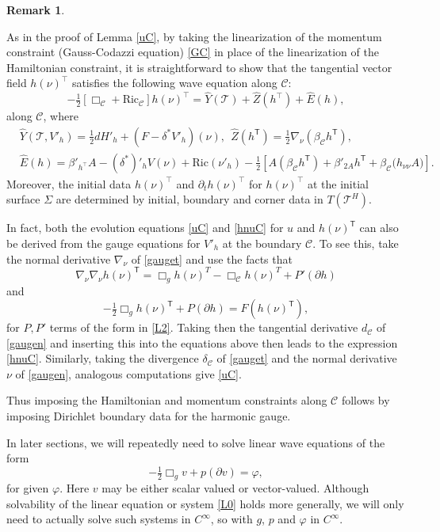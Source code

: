 \documentclass[10pt]{amsart}
\renewcommand{\b}{\beta}
\renewcommand{\d}{\delta}
\newcommand{\f}{\varphi}
\newcommand{\Si}{\Sigma}
\newcommand{\cC}{{\mathcal C}}
\newcommand{\cT}{{\mathcal T}}
\newcommand{\Ric}{\mathrm{Ric}}
\newcommand{\tT}{\mathsf{T}}
\newcommand{\be}{\begin{equation}}
\newcommand{\ee}{\end{equation}}
\newcommand{\bes}{\begin{equation*}}
\newcommand{\ees}{\end{equation*}}
\newcommand{\p}{\partial}
\renewcommand{\hat}{\widehat}
\newcommand{\<}{\langle}
\renewcommand{\>}{\rangle}
\theoremstyle{plain}
\theoremstyle{remark}
\theoremstyle{definition}
\newtheorem{remark}[lemma]{Remark}
\numberwithin{equation}{section}
\begin{document}
\begin{remark}\label{GCG}
{\rm As in the proof of Lemma \ref{uC}, by taking the linearization of the momentum constraint (Gauss-Codazzi equation) \eqref{GC} in place of the linearization of 
the Hamiltonian constraint, it is straightforward to show that the tangential vector field $h(\nu)^\intercal$ satisfies the following wave equation along $\cC$:  
\be\label{hnuC}
-\tfrac{1}{2}[\Box_\cC+\Ric_\cC]h(\nu)^\intercal=\hat Y(\cT)+\hat Z(h^\intercal) + \hat E(h),
\ee
along $\cC$, where 
\bes\begin{split}
&\hat Y(\cT, V'_h)=  { \tfrac{1}{2}dH'_h} + (F-\d^* V'_h)(\nu) , \ \ \hat Z(h^{\tT}) = \tfrac{1}{2}\nabla_\nu (\b_\cC h^{\tT}),\\
&\hat E(h)=
\b'_{h^\intercal}A - (\d^*)'_h V(\nu)+\Ric(\nu'_h)-\tfrac{1}{2}[A(\b_\cC h^{\tT})+\b'_{2A}h^{\tT}+\b_\cC\big(h_{\nu \nu}A\big)].
\end{split}
\ees
Moreover, the initial data $h(\nu)^\intercal$ and $\p_t h(\nu)^\intercal$ for $h(\nu)^\intercal$ at the initial surface $\Si$ are determined by 
initial, boundary and corner data in $T(\cT^H)$. 


In fact, both the evolution equations \eqref{uC} and \eqref{hnuC} for $u$ and $h(\nu)^{\tT}$ can also be derived from the gauge equations for 
$V'_h$ at the boundary $\cC$. To see this, take the normal derivative $\nabla_{\nu}$ of \eqref{gauget} and use the facts that 
$$\nabla_{\nu}\nabla_{\nu} h(\nu)^{\tT} =  \Box_g h(\nu)^T - \Box_{\cC}h(\nu)^T + P'(\p h)$$ and 
$$-\tfrac{1}{2}\Box_g h(\nu)^{\tT} + P(\p h) = F(h(\nu)^{\tT}),$$
for $P, P'$ terms of the form in \eqref{L2}. Taking then the tangential derivative $d_{\cC}$ of \eqref{gaugen} and inserting this into the equations above 
then leads to the expression \eqref{hnuC}. Similarly, taking the divergence $\d_{\cC}$ of \eqref{gauget} and the normal derivative $\nu$ 
of \eqref{gaugen}, analogous computations give \eqref{uC}. 

  Thus imposing the Hamiltonian and momentum constraints along $\cC$ follows by imposing Dirichlet boundary data for the 
harmonic gauge. 
}
\end{remark}


  In later sections, we will repeatedly need to solve linear wave equations of the form 
\be \label{L0}
-\tfrac{1}{2}\Box_g v + p(\p v)  = \f,
\ee
for given $\f$. Here $v$ may be either scalar valued or vector-valued. Although solvability of the linear equation 
or system \eqref{L0} holds more generally, we will only need to actually solve such systems in $C^{\infty}$, so with $g$, $p$ and 
$\f$ in $C^{\infty}$. 
\end{document}
